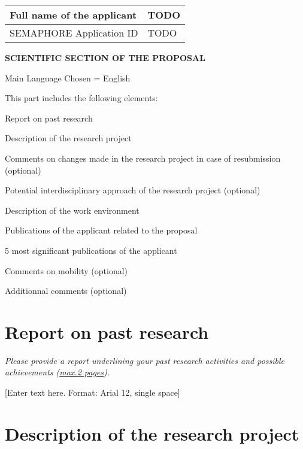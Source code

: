 \documentclass{fnrscq}
\begin{document}
{\small
\begin{tabular}{| p{.49\linewidth} | p{.49\linewidth} |}
  \hline
  Full name of the applicant & TODO\\
  \hline
  SEMAPHORE Application ID & TODO\\
  \hline
\end{tabular}
}

\begin{center}
{\large
\fontsize{16pt}{16pt}\selectfont
 \textbf{SCIENTIFIC SECTION OF THE PROPOSAL}}

{\footnotesize\sc Main Language Chosen = English}
\end{center}

{\footnotesize
\begin{mdframed}[userdefinedwidth=11cm,align=center]
This part includes the following elements:
\begin{compactenum}
\item Report on past research
\item Description of the research project
\item Comments on changes made in the research project in case of resubmission (optional)
\item Potential interdisciplinary approach of the research project (optional)
\item Description of the work environment 
\item Publications of the applicant related to the proposal
\item 5 most significant publications of the applicant
\item Comments on mobility (optional)
\item Additionnal comments (optional)
\end{compactenum}
\end{mdframed}
}

\clearpage


\section{Report on past research}

\textit{\footnotesize Please provide a report underlining your past research activities and
  possible achievements (\uline{max.2 pages}).}

[Enter text here. Format: Arial 12, single space]


\section{Description of the research project}
\end{document}
